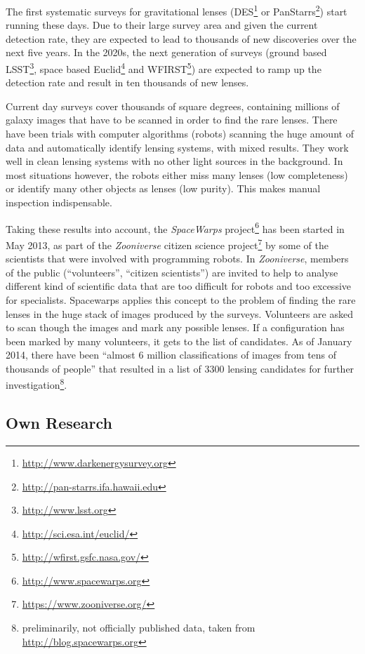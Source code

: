 \documentclass[11pt]{article}
\begin{document}
The first systematic surveys for gravitational lenses (DES\footnote{\url{http://www.darkenergysurvey.org}} or PanStarrs\footnote{\url{http://pan-starrs.ifa.hawaii.edu}}) start running these days.
Due to their large survey area and given the current detection rate, they are expected to lead to thousands of new discoveries over the next five years.
In the 2020s, the next generation of surveys (ground based LSST\footnote{\url{http://www.lsst.org}}, space based Euclid\footnote{\url{http://sci.esa.int/euclid/}} and WFIRST\footnote{\url{http://wfirst.gsfc.nasa.gov/}}) are expected to ramp up the detection rate and result in ten thousands of new lenses.

Current day surveys cover thousands of square degrees, containing millions of galaxy images that have to be scanned in order to find the rare lenses.
There have been trials with computer algorithms (robots) scanning the huge amount of data and automatically identify lensing systems\cite{robots}, with mixed results.
They work well in clean lensing systems with no other light sources in the background.
In most situations however, the robots either miss many lenses (low completeness) or identify many other objects as lenses (low purity).
This makes manual inspection indispensable.

Taking these results into account, the \emph{SpaceWarps} project\footnote{\url{http://www.spacewarps.org}} has been started in May 2013, as part of the \emph{Zooniverse} citizen science project\footnote{\url{https://www.zooniverse.org/}} by some of the scientists that were involved with programming robots.
In \emph{Zooniverse}, members of the public (``volunteers'', ``citizen scientists'') are invited to help to analyse different kind of scientific data that are too difficult for robots and too excessive for specialists.
Spacewarps applies this concept to the problem of finding the rare lenses in the huge stack of images produced by the surveys.
Volunteers are asked to scan though the images and mark any possible lenses.
If a configuration has been marked by many volunteers, it gets to the list of candidates.
As of January 2014, there have been ``almost 6 million classifications of images from tens of thousands of people'' that resulted in a list of 3300 lensing candidates for further investigation\footnote{preliminarily, not officially published data, taken from \url{http://blog.spacewarps.org}}.



\subsection{Own Research}
\end{document}
